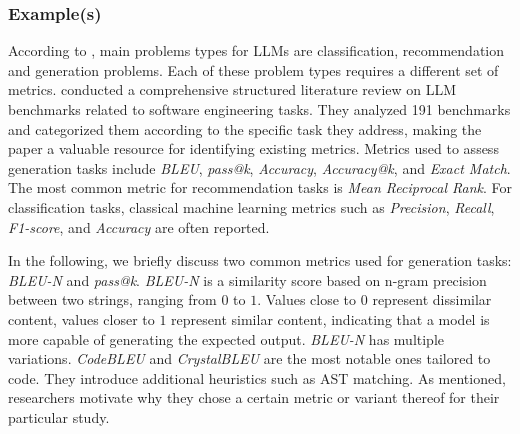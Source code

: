 \subsubsection{Example(s)}

According to \citeauthor{10.1145/3695988}, main problems types for LLMs are classification, recommendation and generation problems.
Each of these problem types requires a different set of metrics.
\citeauthor{hu2025assessingadvancingbenchmarksevaluating} conducted a comprehensive structured literature review on LLM benchmarks related to software engineering tasks.
They analyzed 191 benchmarks and categorized them according to the specific task they address, making the paper a valuable resource for identifying existing metrics. 
Metrics used to assess generation tasks include \emph{BLEU}, \emph{pass@k}, \emph{Accuracy}, \emph{Accuracy@k}, and \emph{Exact Match}.
The most common metric for recommendation tasks is \emph{Mean Reciprocal Rank}.
For classification tasks, classical machine learning metrics such as \emph{Precision}, \emph{Recall}, \emph{F1-score}, and \emph{Accuracy} are often reported.

In the following, we briefly discuss two common metrics used for generation tasks: \emph{BLEU-N} and \emph{pass@k}.
\emph{BLEU-N} \cite{DBLP:conf/acl/PapineniRWZ02} is a similarity score based on n-gram precision between two strings, ranging from $0$ to $1$.
Values close to $0$ represent dissimilar content, values closer to $1$ represent similar content, indicating that a model is more capable of generating the expected output. %
\emph{BLEU-N} has multiple variations.
\emph{CodeBLEU} \cite{DBLP:journals/corr/abs-2009-10297} and \emph{CrystalBLEU} \cite{DBLP:conf/kbse/EghbaliP22} are the most notable ones tailored to code.
They introduce additional heuristics such as AST matching.
As mentioned, researchers \must motivate why they chose a certain metric or variant thereof for their particular study.

